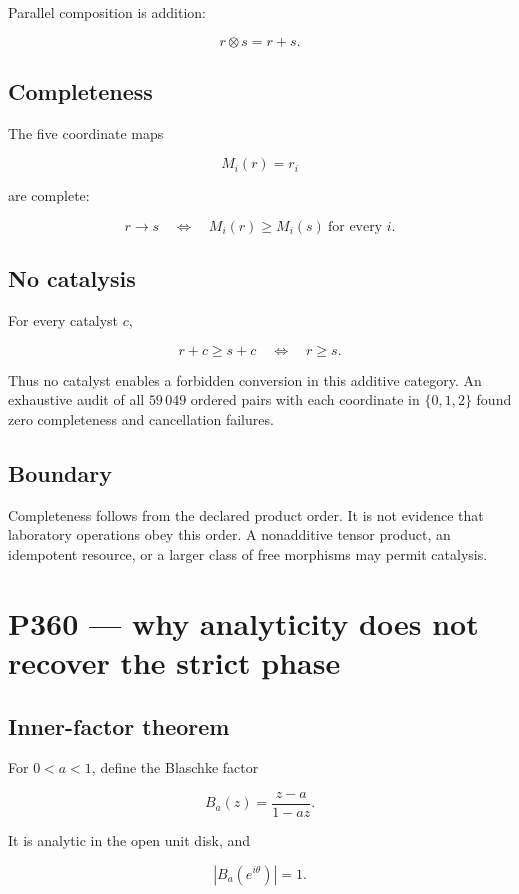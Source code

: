 \documentclass[11pt,a4paper,openany]{report}
\begin{document}
Parallel composition is addition:

\[
r\otimes s=r+s.
\]

\section{Completeness}

The five coordinate maps

\[
M_i(r)=r_i
\]

are complete:

\[
r\to s
\quad\Longleftrightarrow\quad
M_i(r)\geq M_i(s)\ \text{for every }i.
\]

\section{No catalysis}

For every catalyst \(c\),

\[
r+c\geq s+c
\quad\Longleftrightarrow\quad
r\geq s.
\]

Thus no catalyst enables a forbidden conversion in this additive category. An exhaustive audit of all \(59\,049\) ordered pairs with each coordinate in \(\{0,1,2\}\) found zero completeness and cancellation failures.

\section{Boundary}

Completeness follows from the declared product order. It is not evidence that laboratory operations obey this order. A nonadditive tensor product, an idempotent resource, or a larger class of free morphisms may permit catalysis.

\chapter{P360 --- why analyticity does not recover the strict phase}

\section{Inner-factor theorem}

For \(0<a<1\), define the Blaschke factor

\[
B_a(z)=\frac{z-a}{1-az}.
\]

It is analytic in the open unit disk, and

\[
|B_a(e^{i\theta})|=1.
\]
\end{document}

